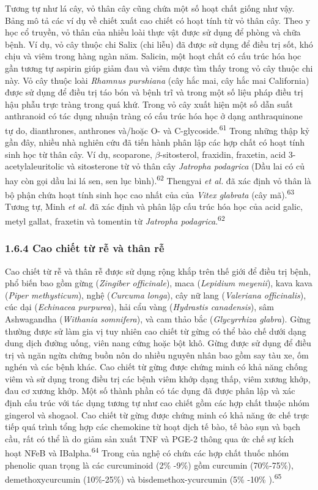 \documentclass[
  letterpaper,
  DIV=11,
  numbers=noendperiod]{scrartcl}
\begin{document}
Tương tự như lá cây, vỏ thân cây cũng chứa một số hoạt chất giống như
vậy. Bảng mô tả các ví dụ về chiết xuất cao chiết có hoạt tính từ vỏ
thân cây. Theo y học cổ truyền, vỏ thân của nhiều loài thực vật được sử
dụng để phòng và chữa bệnh. Ví dụ, vỏ cây thuộc chi Salix (chi liễu) đã
được sử dụng để điều trị sốt, khó chịu và viêm trong hàng ngàn năm.
Salicin, một hoạt chất có cấu trúc hóa học gần tương tự aspirin giúp
giảm đau và viêm được tìm thấy trong vỏ cây thuộc chi này. Vỏ cây thuộc
loài \emph{Rhamnus purshiana} (cây hắc mai, cây hắc mai California) được
sử dụng để điều trị táo bón và bệnh trĩ và trong một số liệu pháp điều
trị hậu phẫu trực tràng trong quá khứ. Trong vỏ cây xuất hiện một số dẫn
suất anthranoid có tác dụng nhuận tràng có cấu trúc hóa học ở dạng
anthraquinone tự do, dianthrones, anthrones và/hoặc O- và
C-glycoside.\textsuperscript{61} Trong những thập kỷ gần đây, nhiều nhà
nghiên cứu đã tiến hành phân lập các hợp chất có hoạt tính sinh học từ
thân cây. Ví dụ, scoparone, \(\beta\)-sitosterol, fraxidin, fraxetin,
acid 3-acetylaleuritolic và sitosterone từ vỏ thân cây \emph{Jatropha
podagrica} (Dầu lai có củ hay còn gọi dầu lai lá sen, sen lục
bình).\textsuperscript{62} Thengyai \emph{et al.} đã xác định vỏ thân là
bộ phận chứa hoạt tính sinh học cao nhất của của \emph{Vitex glabrata}
(cây mã).\textsuperscript{63} Tương tự, Minh \emph{et al.} đã xác định
và phân lập cấu trúc hóa học của acid galic, metyl gallat, fraxetin và
tomentin từ \emph{Jatropha podagrica}.\textsuperscript{62}

\subsubsection{1.6.4 Cao chiết từ rễ và thân
rễ}\label{cao-chiux1ebft-tux1eeb-rux1ec5-vuxe0-thuxe2n-rux1ec5}

Cao chiết từ rễ và thân rễ được sử dụng rộng khắp trên thế giới để điều
trị bệnh, phổ biến bao gồm gừng (\emph{Zingiber officinale}), maca
(\emph{Lepidium meyenii}), kava kava (\emph{Piper methysticum}), nghệ
(\emph{Curcuma longa}), cây nữ lang (\emph{Valeriana officinalis}), cúc
dại (\emph{Echinacea purpurea}), hải cẩu vàng (\emph{Hydrastis
canadensis}), sâm Ashwagandha (\emph{Withania somnifera}), và cam thảo
bắc (\emph{Glycyrrhiza glabra}). Gừng thường được sử làm gia vị tuy
nhiên cao chiết từ gừng có thể bào chế dưới dạng dung dịch đường uống,
viên nang cứng hoặc bột khô. Gừng được sử dụng để điều trị và ngăn ngừa
chứng buồn nôn do nhiều nguyên nhân bao gồm say tàu xe, ốm nghén và các
bệnh khác. Cao chiết từ gừng được chứng minh có khả năng chống viêm và
sử dụng trong điều trị các bệnh viêm khớp dạng thấp, viêm xương khớp,
đau cơ xương khớp. Một số thành phần có tác dụng đã được phân lập và xác
định cấu trúc với tác dụng tương tự như cao chiết gồm các hợp chất thuộc
nhóm gingerol và shogaol. Cao chiết từ gừng được chứng minh có khả năng
ức chế trực tiếp quá trình tổng hợp các chemokine từ hoạt dịch tế bào,
tế bào sụn và bạch cầu, rất có thể là do giảm sản xuất TNF và PGE-2
thông qua ức chế sự kích hoạt NFeB và IBalpha.\textsuperscript{64} Trong
của nghệ có chứa các hợp chất thuốc nhóm phenolic quan trọng là các
curcuminoid (2\% -9\%) gồm curcumin (70\%-75\%), demethoxycurcumin
(10\%-25\%) và bisdemethox-ycurcumin (5\% -10\% ).\textsuperscript{65}
\end{document}
